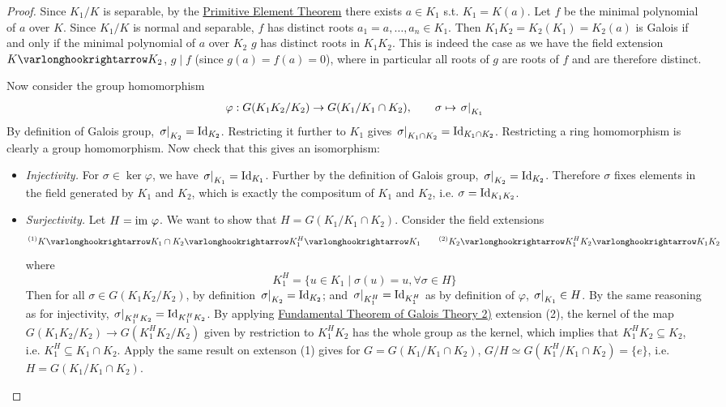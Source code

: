 \documentclass{article}
\begin{document}
\begin{proof}
    Since $K_1/K$ is separable, by the \hyperref[thm: primitive element theorem]{Primitive Element Theorem} there exists $a \in K_1$ s.t. $K_1 = K(a)$. Let $f$ be the minimal polynomial of $a$ over $K$. Since $K_1/K$ is normal and separable, $f$ has distinct roots $a_1 = a, \dots, a_n \in K_1$. Then $K_1 K_2 = K_2(K_1) = K_2(a)$ is Galois if and only if the minimal polynomial of $a$ over $K_2$ $g$ has distinct roots in $K_1 K_2$. This is indeed the case as we have the field extension $K \ext K_2$, $g \mid f$ (since $g(a) = f(a) = 0$), where in particular all roots of $g$ are roots of $f$ and are therefore distinct. 

    Now consider the group homomorphism
    \[
        \varphi: G(K_1 K_2/K_2) \to G(K_1/K_1 \cap K_2), \qquad \sigma \mapsto \left.\sigma\right|_{K_1}
    \]
    By definition of Galois group, $\left.\sigma\right|_{K_2} = \mathrm{Id}_{K_2}$. Restricting it further to $K_1$ gives $\left.\sigma\right|_{K_1 \cap K_2} = \mathrm{Id}_{K_1 \cap K_2}$. Restricting a ring homomorphism is clearly a group homomorphism. Now check that this gives an isomorphism:
    \begin{itemize}
        \item \emph{Injectivity.} For $\sigma \in \ker \varphi$, we have $\left.\sigma\right|_{K_1} = \mathrm{Id}_{K_1}$. Further by the definition of Galois group, $\left.\sigma\right|_{K_2} = \mathrm{Id}_{K_2}$. Therefore $\sigma$ fixes elements in the field generated by $K_1$ and $K_2$, which is exactly the compositum of $K_1$ and $K_2$, i.e. $\sigma = \mathrm{Id}_{K_1 K_2}$.
        \item \emph{Surjectivity.} Let $H = \mathrm{im}\  \varphi$. We want to show that $H = G(K_1/K_1 \cap K_2)$. Consider the field extensions
        \[
            ^{\text{(1)}}K \ext K_1 \cap K_2 \ext K_1^H \ext K_1 \qquad ^{\text{(2)}}K_2 \ext K_1^H K_2 \ext K_1 K_2
        \]
        where
        \[
            K_1^H = \{u \in K_1 \mid \sigma(u) = u, \forall \sigma \in H\}
        \]
        Then for all $\sigma \in G(K_1 K_2/K_2)$, by definition $\left.\sigma\right|_{K_2} = \mathrm{Id}_{K_2}$; and $\left.\sigma\right|_{K_1^H} = \mathrm{Id}_{K_1^H}$ as by definition of $\varphi$, $\left.\sigma\right|_{K_1} \in H$. By the same reasoning as for injectivity, $\left.\sigma\right|_{K_1^H K_2} = \mathrm{Id}_{K_1^H K_2}$. By applying \hyperref[thm: fundamental theorem of galois theory]{Fundamental Theorem of Galois Theory 2)} extension (2), the kernel of the map $G(K_1 K_2/K_2) \to G(K_1^H K_2/K_2)$ given by restriction to $K_1^H K_2$ has the whole group as the kernel, which implies that $K_1^H K_2 \subseteq K_2$, i.e. $K_1^H \subseteq K_1 \cap K_2$. Apply the same result on extenson (1) gives for $G = G(K_1/K_1 \cap K_2)$, $G/H \simeq G(K_1^H/K_1 \cap K_2) = \{e\}$, i.e. $H = G(K_1/K_1 \cap K_2)$.
    \end{itemize}
\end{proof}
\end{document}
